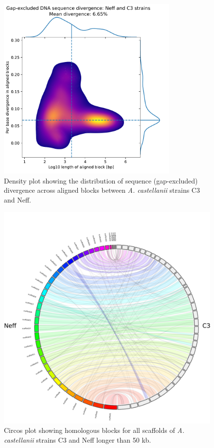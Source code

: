 \begin{figure}[htb]
    \center
    \includegraphics[width=0.8\textwidth]{Parts/Part02/gfx/acas_strains_div.pdf}
    \caption[Sequence divergence between \textit{A. castellanii} strains C3 and Neff.]{Density plot showing the distribution of sequence (gap-excluded) divergence across aligned blocks between \textit{A. castellanii} strains C3 and Neff.}
    \label{fig:02-02:acas-div}
\end{figure}

\begin{figure}[htb]
    \includegraphics[width=\textwidth]{Parts/Part02/gfx/acas_circos.pdf}
    \caption[Circos plot of \textit{A. castellanii} strains C3 and Neff.]{Circos plot showing homologous blocks for all scaffolds of \textit{A. castellanii} strains C3 and Neff longer than 50 kb.}
    \label{fig:02-02:acas-circos}
\end{figure}

